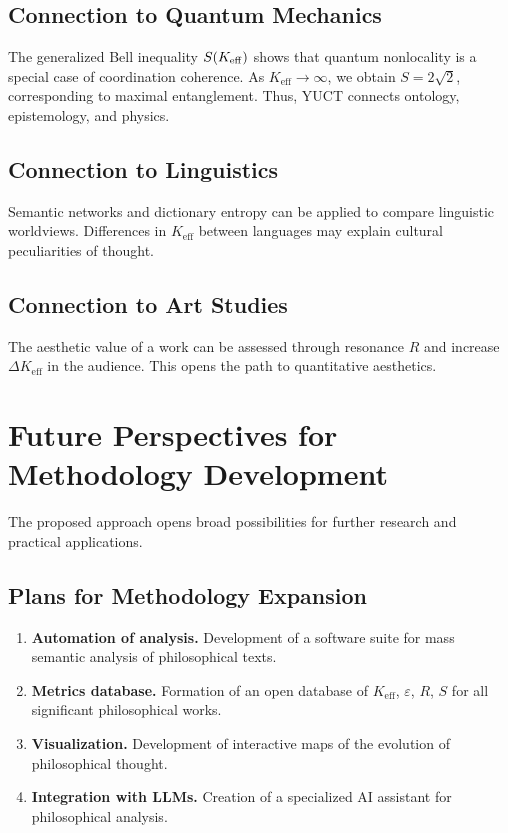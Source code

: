 \documentclass[12pt,a4paper]{article}
\newcommand{\eps}{\varepsilon}
\begin{document}
	\subsection{Connection to Quantum Mechanics}
	
	The generalized Bell inequality \(S(\Keff)\) shows that quantum nonlocality is a special case of coordination coherence. As \(K_{\mathrm{eff}} \to \infty\), we obtain \(S = 2\sqrt{2}\), corresponding to maximal entanglement. Thus, YUCT connects ontology, epistemology, and physics.
	
	\subsection{Connection to Linguistics}
	
	Semantic networks and dictionary entropy can be applied to compare linguistic worldviews. Differences in \(K_{\mathrm{eff}}\) between languages may explain cultural peculiarities of thought.
	
	\subsection{Connection to Art Studies}
	
	The aesthetic value of a work can be assessed through resonance \(R\) and increase \(\Delta K_{\mathrm{eff}}\) in the audience. This opens the path to quantitative aesthetics.
	
	\section{Future Perspectives for Methodology Development}
	\label{sec:future-directions}
	
	The proposed approach opens broad possibilities for further research and practical applications.
	
	\subsection{Plans for Methodology Expansion}
	
	\begin{enumerate}
		\item \textbf{Automation of analysis.} Development of a software suite for mass semantic analysis of philosophical texts.
		\item \textbf{Metrics database.} Formation of an open database of \(K_{\mathrm{eff}}\), \(\eps\), \(R\), \(S\) for all significant philosophical works.
		\item \textbf{Visualization.} Development of interactive maps of the evolution of philosophical thought.
		\item \textbf{Integration with LLMs.} Creation of a specialized AI assistant for philosophical analysis.
	\end{enumerate}
	
\end{document}
